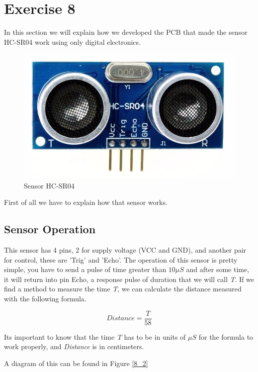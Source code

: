 \section{Exercise 8}

In this section we will explain how we developed the PCB that made
the sensor HC-SR04 work using only digital electronics. 

\begin{figure}[H]
\begin{centering}
\includegraphics[scale=0.2]{images/HC-SR04}
\par\end{centering}
\caption{Sensor HC-SR04}
\end{figure}

First of all we have to explain how that sensor works.

\subsection{Sensor Operation}

This sensor has 4 pins, 2 for supply voltage (VCC and GND), and another
pair for control, these are 'Trig' and 'Echo'. The operation of this
sensor is pretty simple, you have to send a pulse of time greater
than $10\mu S$ and after some time, it will return into pin Echo,
a response pulse of duration that we will call \emph{T}. If we find
a method to measure the time \emph{T}, we can calculate the distance
measured with the following formula.

\[
Distance=\frac{T}{58}
\]

Its important to know that the time \emph{T }has to be in units of
$\mu S$ for the formula to work properly, and \emph{Distance }is
in centimeters.

A diagram of this can be found in Figure \ref{8_2}

